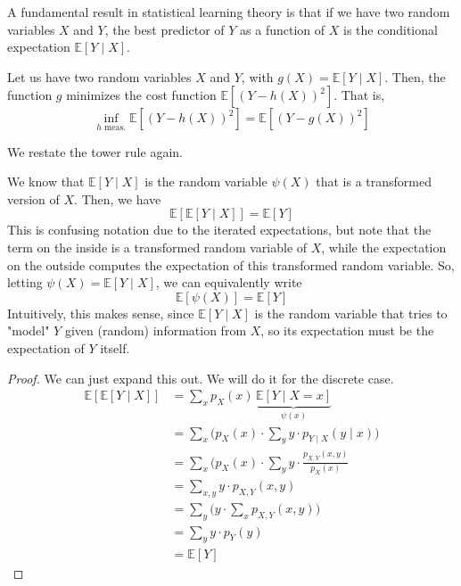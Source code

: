 \documentclass{article}
\begin{document}
    A fundamental result in statistical learning theory is that if we have two random variables $X$ and $Y$, the best predictor of $Y$ as a function of $X$ is the conditional expectation $\mathbb{E}[Y \mid X]$. 

    \begin{theorem}
      Let us have two random variables $X$ and $Y$, with $g(X) = \mathbb{E}[Y \mid X]$. Then, the function $g$ minimizes the cost function $\mathbb{E}[ (Y - h(X))^2]$. That is, 
      \begin{equation}
        \inf_{h \text{ meas.}} \mathbb{E}[( Y - h(X))^2] = \mathbb{E} [(Y - g(X))^2]
      \end{equation}
    \end{theorem}

    We restate the tower rule again. 

    \begin{theorem}
      We know that $\mathbb{E}[Y \mid X]$ is the random variable $\psi(X)$ that is a transformed version of $X$. Then, we have
      \begin{equation}
        \mathbb{E}[ \mathbb{E}[Y \mid X]] = \mathbb{E}[Y]
      \end{equation}
      This is confusing notation due to the iterated expectations, but note that the term on the inside is a transformed random variable of $X$, while the expectation on the outside computes the expectation of this transformed random variable. So, letting $\psi(X) = \mathbb{E}[Y \mid X]$, we can equivalently write 
      \begin{equation}
        \mathbb{E}[ \psi(X)] = \mathbb{E}[Y]
      \end{equation}
      Intuitively, this makes sense, since $\mathbb{E}[Y \mid X]$ is the random variable that tries to "model" $Y$ given (random) information from $X$, so its expectation must be the expectation of $Y$ itself. 
    \end{theorem}
    \begin{proof}
      We can just expand this out. We will do it for the discrete case. 
      \begin{align*}
        \mathbb{E}[ \mathbb{E}[Y \mid X]] & = \sum_x p_X (x) \, \underbrace{\mathbb{E}[Y \mid X = x]}_{\psi(x)} \\
        & = \sum_x \bigg( p_X (x) \cdot \sum_y y \cdot p_{Y \mid X} (y \mid x) \bigg) \\
        & = \sum_x \bigg( p_X (x) \cdot \sum_y y \cdot \frac{p_{X, Y} (x, y)}{p_X (x)} \\
        & = \sum_{x, y} y \cdot p_{X, Y} (x, y) \\
        & = \sum_y \bigg( y \cdot \sum_x p_{X, Y} (x, y) \bigg) \\
        & = \sum_y y \cdot p_Y (y) \\
        & = \mathbb{E}[Y]
      \end{align*}
    \end{proof}
\end{document}
